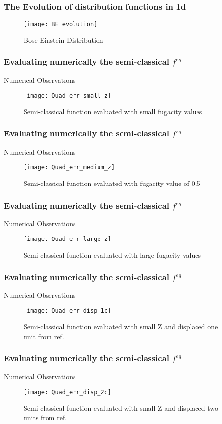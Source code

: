 \begin{frame}
	\frametitle{The Evolution of distribution functions in 1d}
	\begin{figure}[p9]
	\centering
	\texttt{[image: BE\_evolution]}%
	\caption{Bose-Einstein Distribution}
	\end{figure}
\end{frame}

\begin{frame}
	\frametitle{Evaluating numerically the semi-classical $f^{eq}$}
	Numerical Observations
	\begin{figure}[small_z]
	\centering
	\texttt{[image: Quad\_err\_small\_z]}%
	\caption{Semi-classical function evaluated with small fugacity values}
	\end{figure}
\end{frame}

\begin{frame}
	\frametitle{Evaluating numerically the semi-classical $f^{eq}$}
	Numerical Observations
	\begin{figure}[medium_z]
	\centering
	\texttt{[image: Quad\_err\_medium\_z]}%
	\caption{Semi-classical function evaluated with fugacity value of 0.5}
	\end{figure}
\end{frame}

\begin{frame}
	\frametitle{Evaluating numerically the semi-classical $f^{eq}$}
	Numerical Observations
	\begin{figure}[large_z]
	\centering
	\texttt{[image: Quad\_err\_large\_z]}%
	\caption{Semi-classical function evaluated with large fugacity values}
	\end{figure}
\end{frame}

\begin{frame}
	\frametitle{Evaluating numerically the semi-classical $f^{eq}$}
	Numerical Observations
	\begin{figure}[disp_a_1]
	\centering
	\texttt{[image: Quad\_err\_disp\_1c]}%
	\caption{Semi-classical function evaluated with small Z and displaced one unit from ref.}
	\end{figure}
\end{frame}

\begin{frame}
	\frametitle{Evaluating numerically the semi-classical $f^{eq}$}
	Numerical Observations
	\begin{figure}[disp_a_2]
	\centering
	\texttt{[image: Quad\_err\_disp\_2c]}%
	\caption{Semi-classical function evaluated with small Z and displaced two units from ref.}
	\end{figure}
\end{frame}

